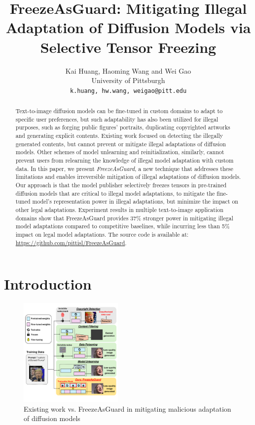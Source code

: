 \documentclass{article}
\title{FreezeAsGuard: Mitigating Illegal Adaptation of Diffusion Models via Selective Tensor Freezing}
\author{%
	Kai Huang, Haoming Wang and Wei Gao\\
	University of Pittsburgh\\
	\texttt{k.huang, hw.wang, weigao@pitt.edu} \\	 
}
\begin{document}
\maketitle
\begin{abstract}
	Text-to-image diffusion models can be fine-tuned in custom domains to adapt to specific user preferences, but such adaptability has also been utilized for illegal purposes, such as forging public figures' portraits, duplicating copyrighted artworks and generating explicit contents. Existing work focused on detecting the illegally generated contents, but cannot prevent or mitigate illegal adaptations of diffusion models. Other schemes of model unlearning and reinitialization, similarly, cannot prevent users from relearning the knowledge of illegal model adaptation with custom data. In this paper, we present \emph{FreezeAsGuard}, a new technique that addresses these limitations and enables irreversible mitigation of illegal adaptations of diffusion models. Our approach is that the model publisher selectively freezes tensors in pre-trained diffusion models that are critical to illegal model adaptations, to mitigate the fine-tuned model's representation power in illegal adaptations, but minimize the impact on other legal adaptations. %
	Experiment results in multiple text-to-image application domains show that FreezeAsGuard provides 37\% stronger power in mitigating illegal model adaptations compared to competitive baselines, while incurring less than 5\% impact on legal model adaptations.  The source code is available at: \url{https://github.com/pittisl/FreezeAsGuard}.
\end{abstract} 

\vspace{-0.15in}
\section{Introduction}
\vspace{-0.05in}


\begin{figure}
	\centering
	\vspace{-0.4in}
	\includegraphics[width=0.45\textwidth]{figures/comparison.pdf}
	\vspace{-0.3in}
	\caption{\label{fig:comparison} Existing work vs. FreezeAsGuard in mitigating malicious adaptation of diffusion models}
	\vspace{-0.25in}
\end{figure}
\end{document}
